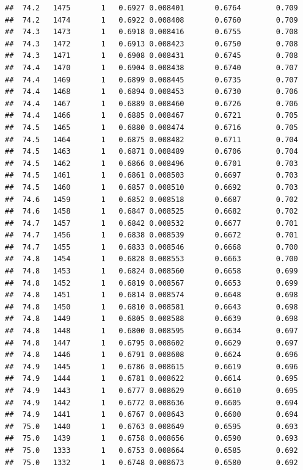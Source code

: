 \documentclass[
]{book}
\begin{document}
\begin{verbatim}
##  74.2   1475       1   0.6927 0.008401       0.6764        0.709
##  74.2   1474       1   0.6922 0.008408       0.6760        0.709
##  74.3   1473       1   0.6918 0.008416       0.6755        0.708
##  74.3   1472       1   0.6913 0.008423       0.6750        0.708
##  74.3   1471       1   0.6908 0.008431       0.6745        0.708
##  74.4   1470       1   0.6904 0.008438       0.6740        0.707
##  74.4   1469       1   0.6899 0.008445       0.6735        0.707
##  74.4   1468       1   0.6894 0.008453       0.6730        0.706
##  74.4   1467       1   0.6889 0.008460       0.6726        0.706
##  74.4   1466       1   0.6885 0.008467       0.6721        0.705
##  74.5   1465       1   0.6880 0.008474       0.6716        0.705
##  74.5   1464       1   0.6875 0.008482       0.6711        0.704
##  74.5   1463       1   0.6871 0.008489       0.6706        0.704
##  74.5   1462       1   0.6866 0.008496       0.6701        0.703
##  74.5   1461       1   0.6861 0.008503       0.6697        0.703
##  74.5   1460       1   0.6857 0.008510       0.6692        0.703
##  74.6   1459       1   0.6852 0.008518       0.6687        0.702
##  74.6   1458       1   0.6847 0.008525       0.6682        0.702
##  74.7   1457       1   0.6842 0.008532       0.6677        0.701
##  74.7   1456       1   0.6838 0.008539       0.6672        0.701
##  74.7   1455       1   0.6833 0.008546       0.6668        0.700
##  74.8   1454       1   0.6828 0.008553       0.6663        0.700
##  74.8   1453       1   0.6824 0.008560       0.6658        0.699
##  74.8   1452       1   0.6819 0.008567       0.6653        0.699
##  74.8   1451       1   0.6814 0.008574       0.6648        0.698
##  74.8   1450       1   0.6810 0.008581       0.6643        0.698
##  74.8   1449       1   0.6805 0.008588       0.6639        0.698
##  74.8   1448       1   0.6800 0.008595       0.6634        0.697
##  74.8   1447       1   0.6795 0.008602       0.6629        0.697
##  74.8   1446       1   0.6791 0.008608       0.6624        0.696
##  74.9   1445       1   0.6786 0.008615       0.6619        0.696
##  74.9   1444       1   0.6781 0.008622       0.6614        0.695
##  74.9   1443       1   0.6777 0.008629       0.6610        0.695
##  74.9   1442       1   0.6772 0.008636       0.6605        0.694
##  74.9   1441       1   0.6767 0.008643       0.6600        0.694
##  75.0   1440       1   0.6763 0.008649       0.6595        0.693
##  75.0   1439       1   0.6758 0.008656       0.6590        0.693
##  75.0   1333       1   0.6753 0.008664       0.6585        0.692
##  75.0   1332       1   0.6748 0.008673       0.6580        0.692

\end{verbatim}
\end{document}
